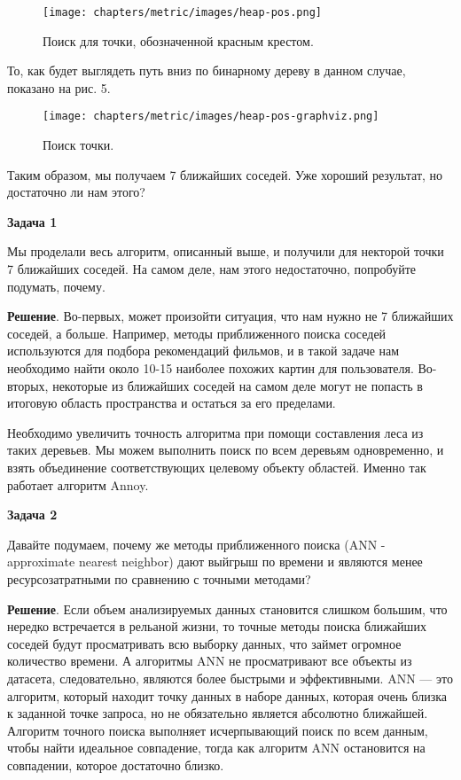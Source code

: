 \begin{figure}[ht]
    \centering
    \texttt{[image: chapters/metric/images/heap-pos.png]}
    \caption{Поиск для точки, обозначенной красным крестом.}
    \label{fig:heap-pos}
\end{figure}

То, как будет выглядеть путь вниз по бинарному дереву в данном случае, показано на рис. 5. 

\begin{figure}[ht]
    \centering
    \texttt{[image: chapters/metric/images/heap-pos-graphviz.png]}
    \caption{Поиск точки.}
    \label{fig:heap-pos-graph}
\end{figure}

Таким образом, мы получаем 7 ближайших соседей. Уже хороший результат, но достаточно ли нам этого?

\textbf{Задача 1}

Мы проделали весь алгоритм, описанный выше, и получили для некторой точки 7 ближайших соседей. На самом деле, нам этого недостаточно, попробуйте подумать, почему. 

\textbf{Решение}. Во-первых, может произойти ситуация, что нам нужно не 7 ближайших соседей, а больше.  Например, методы приближенного поиска соседей используются для подбора рекомендаций фильмов, и в такой задаче нам необходимо найти около 10-15 наиболее похожих картин для пользователя. 
Во-вторых, некоторые из ближайших соседей на самом деле могут не попасть в итоговую область пространства и остаться за его пределами. 

Необходимо увеличить точность алгоритма при помощи составления леса из таких деревьев. Мы можем выполнить поиск по всем деревьям одновременно, и взять объединение соответствующих целевому объекту областей. Именно так работает алгоритм Annoy. 

\textbf{Задача 2}

Давайте подумаем, почему же методы приближенного поиска (ANN - approximate nearest neighbor) дают выйгрыш по времени и являются менее ресурсозатратными по сравнению с точными методами?

\textbf{Решение}. Если объем анализируемых данных становится слишком большим, что нередко встречается в рельаной жизни, то точные методы поиска ближайших соседей будут просматривать всю выборку данных, что займет огромное количество времени. А алгоритмы ANN не просматривают все объекты из датасета, следовательно, являются более быстрыми и эффективными. ANN — это алгоритм, который находит точку данных в наборе данных, которая очень близка к заданной точке запроса, но не обязательно является абсолютно ближайшей. Алгоритм точного поиска выполняет исчерпывающий поиск по всем данным, чтобы найти идеальное совпадение, тогда как алгоритм ANN остановится на совпадении, которое достаточно близко.

